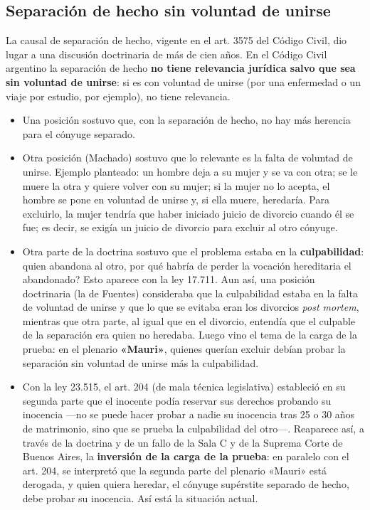 \documentclass[12pt,oneside]{book}
\begin{document}
\subsection{Separación de hecho sin voluntad de unirse}

La causal de separación de hecho, vigente en el art. 3575 del Código Civil, dio lugar a una discusión doctrinaria de más de cien años. En el Código Civil argentino la separación de hecho \textbf{no tiene relevancia jurídica salvo que sea sin voluntad de unirse}: si es con voluntad de unirse (por una enfermedad o un viaje por estudio, por ejemplo), no tiene relevancia.

\begin{itemize}
    \item Una posición sostuvo que, con la separación de hecho, no hay más herencia para el cónyuge separado.
    \item Otra posición (Machado) sostuvo que lo relevante es la falta de voluntad de unirse. Ejemplo planteado: un hombre deja a su mujer y se va con otra; se le muere la otra y quiere volver con su mujer; si la mujer no lo acepta, el hombre se pone en voluntad de unirse y, si ella muere, heredaría. Para excluirlo, la mujer tendría que haber iniciado juicio de divorcio cuando él se fue; es decir, se exigía un juicio de divorcio para excluir al otro cónyuge.
    \item Otra parte de la doctrina sostuvo que el problema estaba en la \textbf{culpabilidad}: quien abandona al otro, \textquestiondown{}por qué habría de perder la vocación hereditaria el abandonado? Esto aparece con la ley 17.711. Aun así, una posición doctrinaria (la de Fuentes) consideraba que la culpabilidad estaba en la falta de voluntad de unirse y que lo que se evitaba eran los divorcios \textit{post mortem}, mientras que otra parte, al igual que en el divorcio, entendía que el culpable de la separación era quien no heredaba. Luego vino el tema de la carga de la prueba: en el plenario \textbf{«Mauri»}, quienes querían excluir debían probar la separación sin voluntad de unirse más la culpabilidad.
    \item Con la ley 23.515, el art. 204 (de mala técnica legislativa) estableció en su segunda parte que el inocente podía reservar sus derechos probando su inocencia ---no se puede hacer probar a nadie su inocencia tras 25 o 30 años de matrimonio, sino que se prueba la culpabilidad del otro---. Reaparece así, a través de la doctrina y de un fallo de la Sala C y de la Suprema Corte de Buenos Aires, la \textbf{inversión de la carga de la prueba}: en paralelo con el art. 204, se interpretó que la segunda parte del plenario «Mauri» está derogada, y quien quiera heredar, el cónyuge supérstite separado de hecho, debe probar su inocencia. Así está la situación actual.
\end{itemize}
\end{document}
